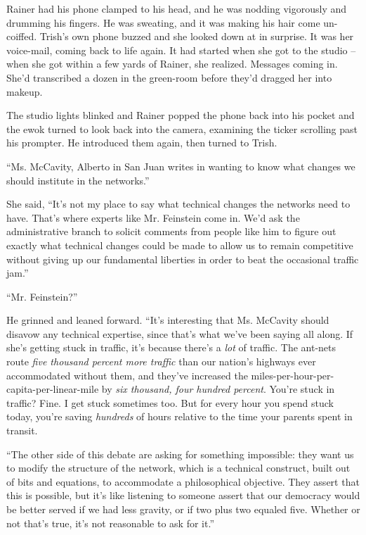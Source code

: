 Rainer had his phone clamped to his head, and he was nodding vigorously 
and drumming his fingers. He was sweating, and it was making his hair 
come un-coiffed. Trish's own phone buzzed and she looked down at in 
surprise. It was her voice-mail, coming back to life again. It had 
started when she got to the studio -- when she got within a few yards 
of Rainer, she realized. Messages coming in. She'd transcribed a dozen 
in the green-room before they'd dragged her into makeup.

The studio lights blinked and Rainer popped the phone back into his 
pocket and the ewok turned to look back into the camera, examining the 
ticker scrolling past his prompter. He introduced them again, then 
turned to Trish.

“Ms. McCavity, Alberto in San Juan writes in wanting to know what 
changes we should institute in the networks.”

She said, “It's not my place to say what technical changes the 
networks need to have. That's where experts like Mr. Feinstein come in. 
We'd ask the administrative branch to solicit comments from people like 
him to figure out exactly what technical changes could be made to allow 
us to remain competitive without giving up our fundamental liberties in 
order to beat the occasional traffic jam.”

“Mr. Feinstein?”

He grinned and leaned forward. “It's interesting that Ms. McCavity 
should disavow any technical expertise, since that's what we've been 
saying all along. If she's getting stuck in traffic, it's because 
there's a \emph{lot} of traffic. The ant-nets route \emph{five thousand 
percent more traffic} than our nation's highways ever accommodated 
without them, and they've increased the 
miles-per-hour-per-capita-per-linear-mile by \emph{six thousand, four 
hundred percent}. You're stuck in traffic? Fine. I get stuck sometimes 
too. But for every hour you spend stuck today, you're saving 
\emph{hundreds} of hours relative to the time your parents spent in 
transit.

“The other side of this debate are asking for something impossible: 
they want us to modify the structure of the network, which is a 
technical construct, built out of bits and equations, to accommodate a 
philosophical objective. They assert that this is possible, but it's 
like listening to someone assert that our democracy would be better 
served if we had less gravity, or if two plus two equaled five. Whether 
or not that's true, it's not reasonable to ask for it.”

